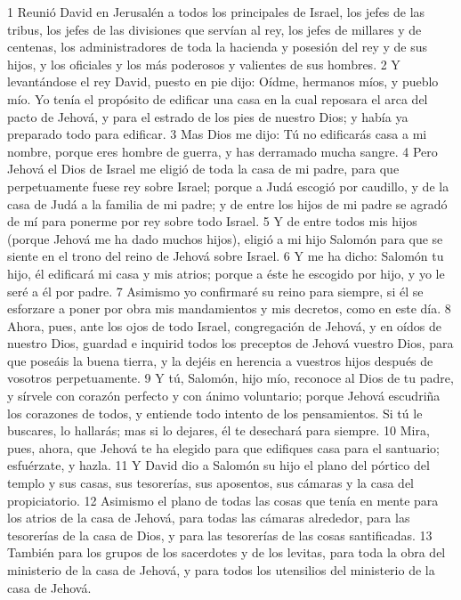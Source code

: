 1 Reunió David en Jerusalén a todos los principales de Israel, los jefes de las tribus, los jefes de las divisiones que servían al rey, los jefes de millares y de centenas, los administradores de toda la hacienda y posesión del rey y de sus hijos, y los oficiales y los más poderosos y valientes de sus hombres.
2 Y levantándose el rey David, puesto en pie dijo: Oídme, hermanos míos, y pueblo mío. Yo tenía el propósito de edificar una casa en la cual reposara el arca del pacto de Jehová, y para el estrado de los pies de nuestro Dios; y había ya preparado todo para edificar. 
3 Mas Dios me dijo: Tú no edificarás casa a mi nombre, porque eres hombre de guerra, y has derramado mucha sangre.
4 Pero Jehová el Dios de Israel me eligió de toda la casa de mi padre, para que perpetuamente fuese rey sobre Israel; porque a Judá escogió por caudillo, y de la casa de Judá a la familia de mi padre; y de entre los hijos de mi padre se agradó de mí para ponerme por rey sobre todo Israel.
5 Y de entre todos mis hijos (porque Jehová me ha dado muchos hijos), eligió a mi hijo Salomón para que se siente en el trono del reino de Jehová sobre Israel.
6 Y me ha dicho: Salomón tu hijo, él edificará mi casa y mis atrios; porque a éste he escogido por hijo, y yo le seré a él por padre.
7 Asimismo yo confirmaré su reino para siempre, si él se esforzare a poner por obra mis mandamientos y mis decretos, como en este día. 
8 Ahora, pues, ante los ojos de todo Israel, congregación de Jehová, y en oídos de nuestro Dios, guardad e inquirid todos los preceptos de Jehová vuestro Dios, para que poseáis la buena tierra, y la dejéis en herencia a vuestros hijos después de vosotros perpetuamente.
9 Y tú, Salomón, hijo mío, reconoce al Dios de tu padre, y sírvele con corazón perfecto y con ánimo voluntario; porque Jehová escudriña los corazones de todos, y entiende todo intento de los pensamientos. Si tú le buscares, lo hallarás; mas si lo dejares, él te desechará para siempre.
10 Mira, pues, ahora, que Jehová te ha elegido para que edifiques casa para el santuario; esfuérzate, y hazla.
11 Y David dio a Salomón su hijo el plano del pórtico del templo y sus casas, sus tesorerías, sus aposentos, sus cámaras y la casa del propiciatorio.
12 Asimismo el plano de todas las cosas que tenía en mente para los atrios de la casa de Jehová, para todas las cámaras alrededor, para las tesorerías de la casa de Dios, y para las tesorerías de las cosas santificadas.
13 También para los grupos de los sacerdotes y de los levitas, para toda la obra del ministerio de la casa de Jehová, y para todos los utensilios del ministerio de la casa de Jehová.
